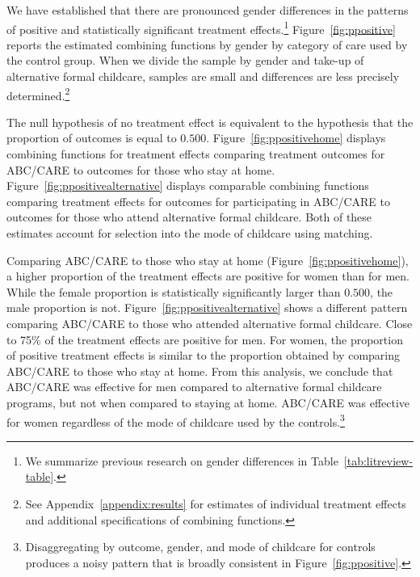 We have established that there are pronounced gender differences in the patterns of positive and statistically significant treatment effects.\footnote{We summarize previous research on gender differences in Table~\ref{tab:litreview-table}.} Figure~\ref{fig:ppositive} reports the estimated combining functions by gender by category of care used by the control group. When we divide the sample by gender and take-up of alternative formal childcare, samples are small and differences are less precisely determined.\footnote{See Appendix~\ref{appendix:results} for estimates of individual treatment effects and additional specifications of combining functions.}

The null hypothesis  of no treatment effect is equivalent to the hypothesis that the proportion of outcomes is equal to $0.500$. Figure~\ref{fig:ppositivehome} displays combining functions for treatment effects comparing treatment outcomes for ABC/CARE to outcomes for those who stay at home. Figure~\ref{fig:ppositivealternative} displays comparable combining functions comparing treatment effects for outcomes for participating in ABC/CARE to outcomes for those who attend alternative formal childcare. Both of these estimates account for selection into the mode of childcare using matching.

Comparing ABC/CARE to those who stay at home (Figure~\ref{fig:ppositivehome}), a higher proportion of the treatment effects are positive for women than for men. While the female proportion is statistically significantly larger than $0.500$, the male proportion is not. Figure~\ref{fig:ppositivealternative} shows a different pattern comparing ABC/CARE to those who attended alternative formal childcare. Close to 75\% of the treatment effects are positive for men. For women, the proportion of positive treatment effects is similar to the proportion obtained by comparing ABC/CARE to those who stay at home. From this analysis, we conclude that ABC/CARE was effective for men compared to alternative formal childcare programs, but not when compared to staying at home. ABC/CARE was effective for women regardless of the mode of childcare used by the controls.\footnote{Disaggregating by outcome, gender, and mode of childcare for controls produces a noisy pattern that is broadly consistent in Figure~\ref{fig:ppositive}.}

